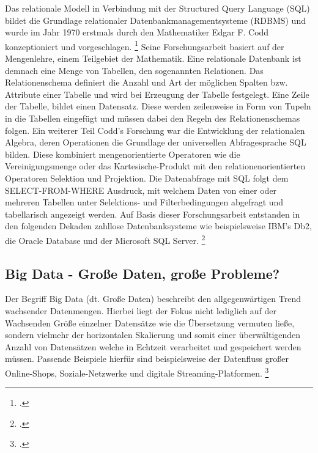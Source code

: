 Das relationale Modell in Verbindung mit der Structured Query Language (SQL)  bildet die Grundlage relationaler Datenbankmanagementsysteme (RDBMS) und wurde im Jahr 1970 erstmals durch den Mathematiker Edgar F. Codd konzeptioniert und vorgeschlagen. \footcite{coddRelationalModelData1970} Seine Forschungsarbeit basiert auf der Mengenlehre, einem Teilgebiet der Mathematik. Eine relationale Datenbank ist demnach eine Menge von Tabellen, den sogenannten Relationen. Das Relationenschema definiert die Anzahl und Art der möglichen Spalten bzw. Attribute einer Tabelle und wird bei Erzeugung der Tabelle festgelegt. Eine Zeile der Tabelle, bildet einen Datensatz. Diese werden zeilenweise in Form von Tupeln in die Tabellen eingefügt und müssen dabei den Regeln des Relationenschemas folgen. Ein weiterer Teil Codd's Forschung war die Entwicklung der relationalen Algebra, deren Operationen die Grundlage der universellen Abfragesprache SQL bilden. Diese kombiniert mengenorientierte Operatoren wie die Vereinigungsmenge oder das Kartesische-Produkt mit den relationenorientierten Operatoren Selektion und Projektion. Die Datenabfrage mit SQL folgt dem SELECT-FROM-WHERE Ausdruck, mit welchem Daten von einer oder mehreren Tabellen unter Selektions- und Filterbedingungen abgefragt und tabellarisch angezeigt werden. Auf Basis dieser Forschungsarbeit entstanden in den folgenden Dekaden zahllose Datenbanksysteme wie beispielsweise IBM's Db2, die Oracle Database und der Microsoft SQL Server. \footcite[S. 15-24]{meierWerkzeugeDigitalenWirtschaft2018}


\subsection{Big Data - Große Daten, große Probleme?}

Der Begriff Big Data (dt. Große Daten) beschreibt den allgegenwärtigen Trend wachsender Datenmengen. Hierbei liegt der Fokus nicht lediglich auf der Wachsenden Größe einzelner Datensätze wie die Übersetzung vermuten ließe, sondern vielmehr der horizontalen Skalierung und somit einer überwältigenden Anzahl von Datensätzen welche in Echtzeit verarbeitet und gespeichert werden müssen. Passende Beispiele hierfür sind beispielsweise der Datenfluss großer Online-Shops, Soziale-Netzwerke und digitale Streaming-Platformen. \footcite[S. 5]{meierWerkzeugeDigitalenWirtschaft2018}